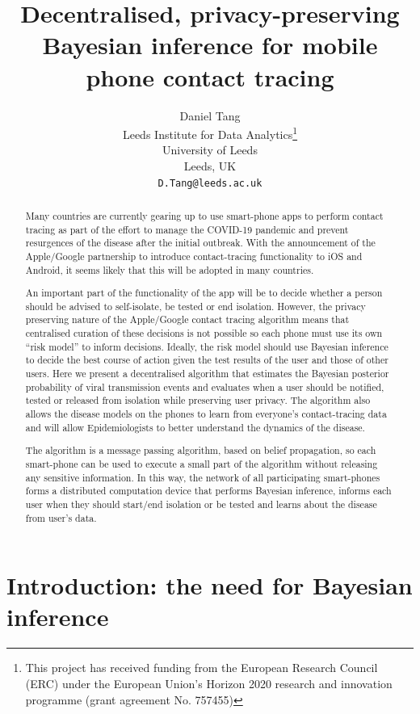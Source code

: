 \documentclass{article}
\title{Decentralised, privacy-preserving Bayesian inference for mobile phone contact tracing}
\author{
  Daniel Tang\\
  Leeds Institute for Data Analytics\thanks{This project has received funding from the European Research Council (ERC) under the European Union’s Horizon 2020 research and innovation programme (grant agreement No. 757455)}\\
  University of Leeds\\
  Leeds, UK\\
  \texttt{D.Tang@leeds.ac.uk} \\
}
\begin{document}
\maketitle

\begin{abstract}
Many countries are currently gearing up to use smart-phone apps to perform contact tracing as part of the effort to manage the COVID-19 pandemic and prevent resurgences of the disease after the initial outbreak. With the announcement of the Apple/Google partnership to introduce contact-tracing functionality to iOS and Android\cite{applegoogle}, it seems likely that this will be adopted in many countries.

An important part of the functionality of the app will be to decide whether a person should be advised to self-isolate, be tested or end isolation. However, the privacy preserving nature of the Apple/Google contact tracing algorithm means that centralised curation of these decisions is not possible so each phone must use its own ``risk model'' to inform decisions. Ideally, the risk model should use Bayesian inference to decide the best course of action given the test results of the user and those of other users. Here we present a decentralised algorithm that estimates the Bayesian posterior probability of viral transmission events and evaluates when a user should be notified, tested or released from isolation while preserving user privacy. The algorithm also allows the disease models on the phones to learn from everyone's contact-tracing data and will allow Epidemiologists to better understand the dynamics of the disease.

The algorithm is a message passing algorithm, based on belief propagation, so each smart-phone can be used to execute a small part of the algorithm without releasing any sensitive information. In this way, the network of all participating smart-phones forms a distributed computation device that performs Bayesian inference, informs each user when they should start/end isolation or be tested and learns about the disease from user's data.
\end{abstract}


\section{Introduction: the need for Bayesian inference}
\end{document}
